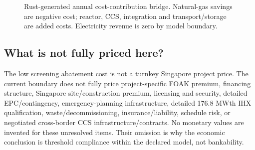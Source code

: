 \begin{figure}[htbp]\centering

\caption{Rust-generated annual cost-contribution bridge.  Natural-gas savings are negative cost; reactor, CCS, integration and transport/storage are added costs.  Electricity revenue is zero by model boundary.}
\label{fig:cost-bridge}
\end{figure}

\subsection{What is not fully priced here?}
The low screening abatement cost is not a turnkey Singapore project price. The current boundary does not fully price project-specific FOAK premium, financing structure, Singapore site/construction premium, licensing and security, detailed EPC/contingency, emergency-planning infrastructure, detailed 176.8 MWth IHX qualification, waste/decommissioning, insurance/liability, schedule risk, or negotiated cross-border CCS infrastructure/contracts. No monetary values are invented for these unresolved items. Their omission is why the economic conclusion is threshold compliance within the declared model, not bankability.
